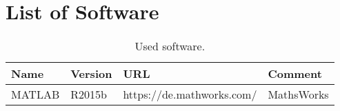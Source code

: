 \chapter*{List of Software}
\label{sec:software}
\begin{table}[htb]
	\centering
		\begin{tabular}{|l|l||l|l|}
		\hline
			\bfseries{Name} & \bfseries{Version} & \bfseries{URL} & \bfseries{Comment}\\
		\hline
		\hline
			MATLAB & R2015b & https://de.mathworks.com/ & MathsWorks\\
		\hline

		\hline
		\end{tabular}
	\caption{Used software.}
	\label{tab:VerwendeteSoftware}
\end{table}

